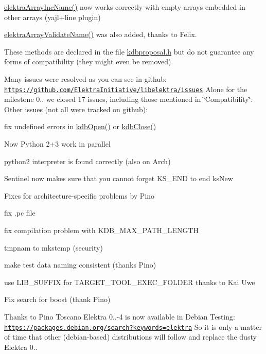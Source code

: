 {\ttfamily \hyperlink{array_8c_afc46476b8d722d89e07a966e023df317}{elektra\+Array\+Inc\+Name()}} now works correctly with empty arrays embedded in other arrays (yajl+line plugin)

{\ttfamily \hyperlink{array_8c_ac97baa33fb7b7e83192e156827ba2eb5}{elektra\+Array\+Validate\+Name()}} was also added, thanks to Felix.

These methods are declared in the file {\ttfamily \hyperlink{kdbproposal_8h}{kdbproposal.\+h}} but do not guarantee any forms of compatibility (they might even be removed).

Many issues were resolved as you can see in github\+: \href{https://github.com/ElektraInitiative/libelektra/issues}{\tt https\+://github.\+com/\+Elektra\+Initiative/libelektra/issues} Alone for the milestone 0.. we closed 17 issues, including those mentioned in \char`\"{}\+Compatibility\char`\"{}. Other issues (not all were tracked on github)\+:


\begin{DoxyItemize}
\item fix undefined errors in {\ttfamily \hyperlink{group__kdb_ga844e1299a84c3fbf1d3a905c5c893ba5}{kdb\+Open()}} or {\ttfamily \hyperlink{group__kdb_gadb54dc9fda17ee07deb9444df745c96f}{kdb\+Close()}}
\item Now Python 2+3 work in parallel
\item python2 interpreter is found correctly (also on Arch)
\item Sentinel now makes sure that you cannot forget {\ttfamily K\+S\+\_\+\+E\+ND} to end {\ttfamily ks\+New}
\item Fixes for architecture-\/specific problems by Pino
\item fix .pc file
\item fix compilation problem with {\ttfamily K\+D\+B\+\_\+\+M\+A\+X\+\_\+\+P\+A\+T\+H\+\_\+\+L\+E\+N\+G\+TH}
\item tmpnam to mkstemp (security)
\item make test data naming consistent (thanks Pino)
\item use {\ttfamily L\+I\+B\+\_\+\+S\+U\+F\+F\+IX for T\+A\+R\+G\+E\+T\+\_\+\+T\+O\+O\+L\+\_\+\+E\+X\+E\+C\+\_\+\+F\+O\+L\+D\+ER} thanks to Kai Uwe
\item Fix search for boost (thank Pino)
\end{DoxyItemize}

Thanks to Pino Toscano Elektra 0..-\/4 is now available in Debian Testing\+: \href{https://packages.debian.org/search?keywords=elektra}{\tt https\+://packages.\+debian.\+org/search?keywords=elektra} So it is only a matter of time that other (debian-\/based) distributions will follow and replace the dusty Elektra 0..

